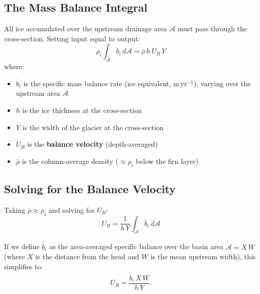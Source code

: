\documentclass[11pt]{article}
\begin{document}
\subsection{The Mass Balance Integral}

All ice accumulated over the upstream drainage area $\mathcal{A}$ must pass through the cross-section.  Setting input equal to output:
\begin{equation}
  \boxed{
  \rho_i \int_{\mathcal{A}} \dot{b}_i \, d\mathcal{A} = \bar{\rho}\, h\, U_B\, Y
  }
  \tag{C\&P Eq.~8.3}
\end{equation}
where:
\begin{itemize}
  \item $\dot{b}_i$ is the specific mass balance rate (ice equivalent, m\,yr$^{-1}$), varying over the upstream area $\mathcal{A}$
  \item $h$ is the ice thickness at the cross-section
  \item $Y$ is the width of the glacier at the cross-section
  \item $U_B$ is the \textbf{balance velocity} (depth-averaged)
  \item $\bar{\rho}$ is the column-average density ($\approx \rho_i$ below the firn layer)
\end{itemize}


\subsection{Solving for the Balance Velocity}

Taking $\bar{\rho} \approx \rho_i$ and solving for $U_B$:
\begin{equation}
  \boxed{
  U_B = \frac{1}{h\,Y} \int_{\mathcal{A}} \dot{b}_i \, d\mathcal{A}
  }
\end{equation}

If we define $\overline{\dot{b}}_i$ as the area-averaged specific balance over the basin area $\mathcal{A} = X\,W$ (where $X$ is the distance from the head and $W$ is the mean upstream width), this simplifies to:
\begin{equation}
  U_B = \frac{\overline{\dot{b}}_i\, X\, W}{h\, Y}.
\end{equation}
\end{document}

